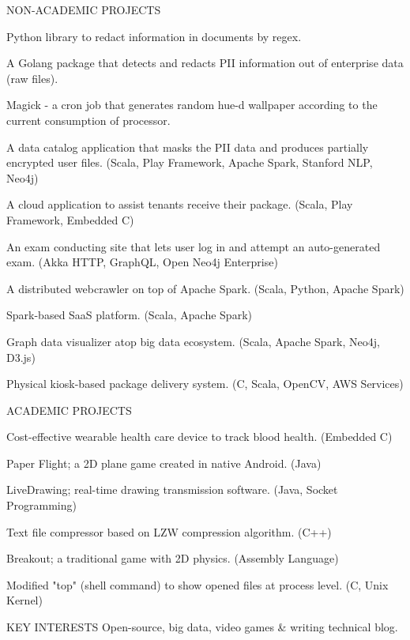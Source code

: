 \documentclass{resume}
\begin{document}
\begin{rSection}{NON-ACADEMIC PROJECTS}
  \begin{rSubsection}{}{} {} {}
    \item Python library to redact information in documents by regex.
    \item A Golang package that detects and redacts PII information out of enterprise data (raw files).
    \item Magick - a cron job that generates random hue-d wallpaper according to the current consumption of processor.
    \item A data catalog application that masks the PII data and produces partially encrypted user files. (Scala, Play Framework, Apache Spark, Stanford NLP, Neo4j)
    \item A cloud application to assist tenants receive their package. (Scala, Play Framework, Embedded C)
    \item An exam conducting site that lets user log in and attempt an auto-generated exam. (Akka HTTP, GraphQL, Open Neo4j Enterprise)
    \item A distributed webcrawler on top of Apache Spark. (Scala, Python, Apache Spark)
    \item Spark-based SaaS platform. (Scala, Apache Spark)
    \item Graph data visualizer atop big data ecosystem. (Scala, Apache Spark, Neo4j, D3.js)
    \item Physical kiosk-based package delivery system. (C, Scala, OpenCV, AWS Services)
  \end{rSubsection}

\end{rSection}

\begin{rSection}{ACADEMIC PROJECTS}
  \begin{rSubsection}{}{} {} {}
    \item Cost-effective wearable health care device to track blood health. (Embedded C)
    \item Paper Flight; a 2D plane game created in native Android. (Java)
    \item LiveDrawing; real-time drawing transmission software. (Java, Socket Programming)
    \item Text file compressor based on LZW compression algorithm. (C++)
    \item Breakout; a traditional game with 2D physics. (Assembly Language)
    \item Modified "top" (shell command) to show opened files at process level. (C, Unix Kernel)
  \end{rSubsection}
\end{rSection}

\begin{rSection}{KEY INTERESTS}
  Open-source, big data, video games \& writing technical blog.
\end{rSection}
\end{document}

